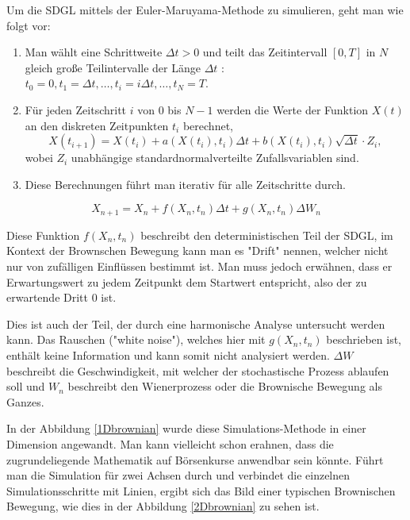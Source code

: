 
Um die SDGL mittels der Euler-Maruyama-Methode zu simulieren, geht man wie folgt vor:

\begin{enumerate}
	\item Man wählt eine Schrittweite $ \Delta t > 0 $ und teilt das Zeitintervall $ [0, T] $ in $ N $ gleich große Teilintervalle der Länge $ \Delta t$ : $ t_0 = 0, t_1 = \Delta t, \dots, t_i = i\Delta t, \dots, t_N = T $.
	\item Für jeden Zeitschritt $ i $ von $ 0 $ bis $ N-1 $ werden die Werte der Funktion $ X(t) $ an den diskreten Zeitpunkten $ t_i $ berechnet,
	\begin{equation}
		X(t_{i+1}) = X(t_i) + a(X(t_i), t_i) \Delta t + b(X(t_i), t_i) \sqrt{\Delta t} \cdot Z_i,
	\end{equation}
	wobei $ Z_i $ unabhängige standardnormalverteilte Zufallsvariablen sind.
	\item Diese Berechnungen führt man iterativ für alle Zeitschritte durch.
\end{enumerate}

\begin{equation}
	X_{n+1} = X_n + f(X_n,t_n) \Delta t + g(X_n,t_n) \Delta W_n
\end{equation}

Diese Funktion $ f(X_n,t_n) $ beschreibt den deterministischen Teil der SDGL, im Kontext der Brownschen Bewegung kann man es "Drift" nennen, welcher nicht nur von zufälligen Einflüssen bestimmt ist. Man muss jedoch erwähnen, dass er Erwartungswert zu jedem Zeitpunkt dem Startwert entspricht, also der zu erwartende Dritt 0 ist. 


Dies ist auch der Teil, der durch eine harmonische Analyse untersucht werden kann. Das Rauschen ("white noise"), welches hier mit $ g(X_n,t_n) $ beschrieben ist, enthält keine Information und kann somit nicht analysiert werden. $ \Delta W $ beschreibt die Geschwindigkeit, mit welcher der stochastische Prozess ablaufen soll und $ W_n $  beschreibt den Wienerprozess oder die Brownische Bewegung als Ganzes.


In der Abbildung \ref{1Dbrownian} wurde diese Simulations-Methode in einer Dimension angewandt. Man kann vielleicht schon erahnen, dass die zugrundeliegende Mathematik auf Börsenkurse anwendbar sein könnte. Führt man die Simulation für zwei Achsen durch und verbindet die einzelnen Simulationsschritte mit Linien, ergibt sich das Bild einer typischen Brownischen Bewegung, wie dies in der Abbildung \ref{2Dbrownian} zu sehen ist.

